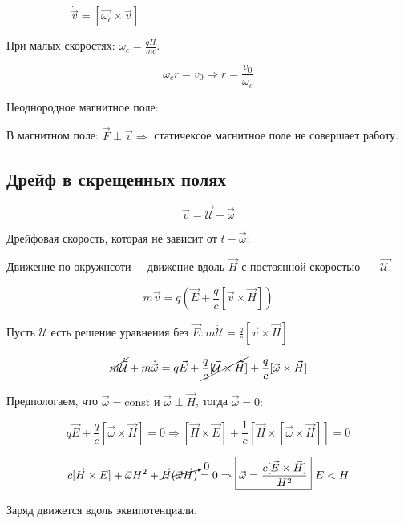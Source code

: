 \begin{figure}[h!]
\begin{subfigure}{0.45\textwidth}
        \caption*{\(\dot{\vec{v}}=[\vec{\omega_c}\times \vec{v}] \)}
        \label{fig:sub2}
    \end{subfigure}
    \caption*{}
    \label{fig:double}
\end{figure}

При малых скоростях:  $\omega_c= \frac{qH}{mc}.$

\[
\omega_c r=v_0 \Rightarrow r=\frac{v_0}{\omega_c} 
\]

\newpage

Неоднородное магнитное поле:


В магнитном поле: $\vec{F}\perp\vec{v}\Rightarrow$ статичексое магнитное поле не совершает работу. 

\subsection*{Дрейф в скрещенных полях}


\[
\vec{v}=\vec{\mathcal{U}}+\vec{\omega}
\]

Дрейфовая скорость, которая не зависит от $t -\vec{\omega}; $

Движение по окружнсоти + движение вдоль $\vec{H}$ с постоянной скоростью $ - \text{ }\vec{\mathcal{U} .}$

\[
m\dot{\vec{v}}=q\left( \vec{E}+\frac{q}{c}[\vec{v}\times \vec{H}]  \right)
\]

Пусть $\mathcal{U}$ есть решение уравнения без $\vec{E}: m\dot{\mathcal{U}}=\frac{q}{c}[\vec{v}\times\vec{H}]$

\[
\cancel{m\dot{\vec{\mathcal{U}}}}+m\dot{\vec{\omega}}=q\vec{E}+\cancel{\frac{q}{c}[\vec{\mathcal{U}}\times \vec{H}]}+\frac{q}{c}[\vec{\omega} \times \vec{H}] 
\]

Предпологаем, что $\vec{\omega}=\mathrm{const} \text{ и } \vec{\omega}\perp\vec{H}$, тогда $\dot{\vec{\omega}}=0:$

\[
q\vec{E}+\frac{q}{c}[\vec{\omega}\times \vec{H}]=0\Rightarrow[\vec{H}\times \vec{E}]+\frac{1}{c}[\vec{H}\times [\vec{\omega}\times \vec{H}]]=0  
\]

\[
c[\vec{H}\times \vec{E}]+\vec{\omega}H^2+\cancelto{0}{\vec{H}(\vec{\omega}\vec{H})}=0\Rightarrow\boxed{\vec{\omega}=\frac{c[\vec{E}\times \vec{H}]}{H^2 }}\text{ } E<H
\]

Заряд движется вдоль эквипотенциали. 